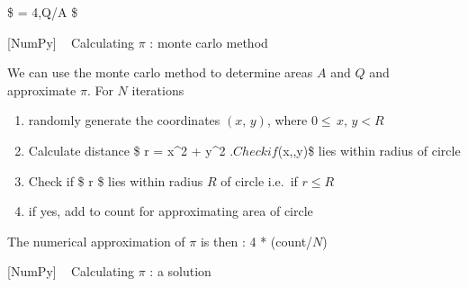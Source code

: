 \documentclass{article}
\begin{document}
\$ \pi = 4,Q/A \$

    {[}NumPy{]} ~ Calculating $\pi$ : monte carlo method

We can use the monte carlo method to determine areas $A$ and $Q$ and
approximate $\pi$. For $N$ iterations

\begin{enumerate}
\def\labelenumi{\arabic{enumi}.}
\itemsep1pt\parskip0pt
\item
  randomly generate the coordinates $(x,\,y)$, where
  $0 \leq \,x,\, y <R$ 
\item
  Calculate distance \$ r = x\^{}2 + y\^{}2 $. Check if $(x,,y)\$ lies
  within radius of circle
\item
  Check if \$ r \$ lies within radius $R$ of circle i.e.~if $r \leq R $ 
\item
  if yes, add to count for approximating area of circle
\end{enumerate}

The numerical approximation of $\pi$ is then : 4 * (count/$N$)

    {[}NumPy{]} ~ Calculating $\pi$ : a solution 
\end{document}
